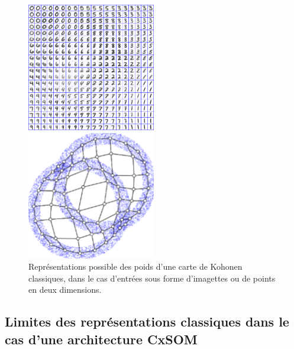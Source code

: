 \documentclass[../main]{subfiles}
\begin{document}
\begin{figure}
\begin{minipage}{0.5\textwidth}
\centering
\includegraphics[width=0.5\textwidth]{digits.jpg}
\end{minipage}
\begin{minipage}{0.5\textwidth}
\centering
\includegraphics[width=0.5\textwidth]{points.png}
\end{minipage}
\caption{Représentations possible des poids d'une carte de Kohonen classiques, dans le cas d'entrées sous forme d'imagettes ou de points en deux dimensions.\label{fig:representation}}
\end{figure}

\subsection{Limites des représentations classiques dans le cas d'une architecture CxSOM}
\end{document}
